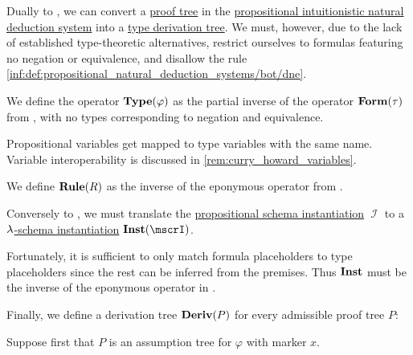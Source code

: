 \begin{algorithm}\label{alg:proof_tree_to_type_derivation}
  Dually to , we can convert a \hyperref[def:propositional_natural_deduction_proof_tree]{proof tree} in the \hyperref[def:propositional_natural_deduction_systems]{propositional intuitionistic natural deduction system} into a \hyperref[def:type_derivation_tree]{type derivation tree}. We must, however, due to the lack of established type-theoretic alternatives, restrict ourselves to formulas featuring no negation or equivalence, and disallow the rule \ref{inf:def:propositional_natural_deduction_systems/bot/dne}.

  \begin{thmenum}
     We define the operator \( \op*{Type}(\varphi) \) as the partial inverse of the operator \( \op*{Form}(\tau) \) from , with no types corresponding to negation and equivalence.

    Propositional variables get mapped to type variables with the same name. Variable interoperability is discussed in \cref{rem:curry_howard_variables}.

     We define \( \op*{Rule}(R) \) as the inverse of the eponymous operator from .

     Conversely to , we must translate the \hyperref[def:propositional_schema_instantiation]{propositional schema instantiation} \( \mscrI \) to a \hyperref[def:lambda_schema_instantiation]{\( {\mathrm \lambda} \)-schema instantiation} \( \op*{Inst}(\mscrI) \).

    Fortunately, it is sufficient to only match formula placeholders to type placeholders since the rest can be inferred from the premises. Thus \( \op*{Inst} \) must be the inverse of the eponymous operator in .

     Finally, we define a derivation tree \( \op*{Deriv}(P) \) for every admissible proof tree \( P \):
    \begin{thmenum}
       Suppose first that \( P \) is an assumption tree for \( \varphi \) with marker \( x \).


\end{thmenum}
\end{thmenum}
\end{algorithm}
